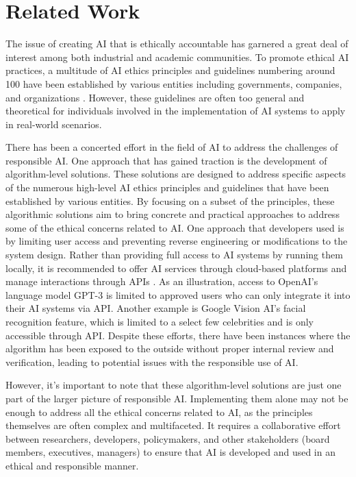 \documentclass[conference]{IEEEtran}
\begin{document}
\section{Related Work}
The issue of creating AI that is ethically accountable has garnered a great deal of interest among both industrial and academic communities. To promote ethical AI practices, a multitude of AI ethics principles and guidelines numbering around 100 have been established by various entities including governments, companies, and organizations \cite{GlobalLandscape}. However, these guidelines are often too general and theoretical for individuals involved in the implementation of AI systems to apply in real-world scenarios.

There has been a concerted effort in the field of AI to address the challenges of responsible AI. One approach that has gained traction is the development of algorithm-level solutions. These solutions are designed to address specific aspects of the numerous high-level AI ethics principles and guidelines that have been established by various entities. By focusing on a subset of the principles, these algorithmic solutions aim to bring concrete and practical approaches to address some of the ethical concerns related to AI. One approach that developers used is by limiting user access and preventing reverse engineering or modifications to the system design. Rather than providing full access to AI systems by running them locally, it is recommended to offer AI services through cloud-based platforms and manage interactions through APIs \cite{TobyAPI}. As an illustration, access to OpenAI's language model GPT-3 is limited to approved users who can only integrate it into their AI systems via API. Another example is Google Vision AI's facial recognition feature, which is limited to a select few celebrities and is only accessible through API. Despite these efforts, there have been instances where the algorithm has been exposed to the outside without proper internal review and verification, leading to potential issues with the responsible use of AI.

However, it's important to note that these algorithm-level solutions are just one part of the larger picture of responsible AI. Implementing them alone may not be enough to address all the ethical concerns related to AI, as the principles themselves are often complex and multifaceted. It requires a collaborative effort between researchers, developers, policymakers, and other stakeholders (board members, executives, managers) to ensure that AI is developed and used in an ethical and responsible manner.
\end{document}
